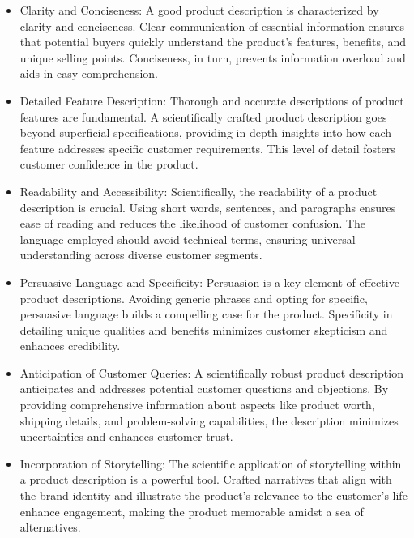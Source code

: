 \begin{itemize}
    \item Clarity and Conciseness: A good product description is characterized by clarity and conciseness. Clear communication of essential information ensures that potential buyers quickly understand the product's features, benefits, and unique selling points. Conciseness, in turn, prevents information overload and aids in easy comprehension.
    \item Detailed Feature Description: Thorough and accurate descriptions of product features are fundamental. A scientifically crafted product description goes beyond superficial specifications, providing in-depth insights into how each feature addresses specific customer requirements. This level of detail fosters customer confidence in the product.
    \item Readability and Accessibility:
    Scientifically, the readability of a product description is crucial. Using short words, sentences, and paragraphs ensures ease of reading and reduces the likelihood of customer confusion. The language employed should avoid technical terms, ensuring universal understanding across diverse customer segments.
    \item Persuasive Language and Specificity:
    Persuasion is a key element of effective product descriptions. Avoiding generic phrases and opting for specific, persuasive language builds a compelling case for the product. Specificity in detailing unique qualities and benefits minimizes customer skepticism and enhances credibility.
    \item Anticipation of Customer Queries: A scientifically robust product description anticipates and addresses potential customer questions and objections. By providing comprehensive information about aspects like product worth, shipping details, and problem-solving capabilities, the description minimizes uncertainties and enhances customer trust.
    \item Incorporation of Storytelling: The scientific application of storytelling within a product description is a powerful tool. Crafted narratives that align with the brand identity and illustrate the product's relevance to the customer's life enhance engagement, making the product memorable amidst a sea of alternatives.
\end{itemize}



